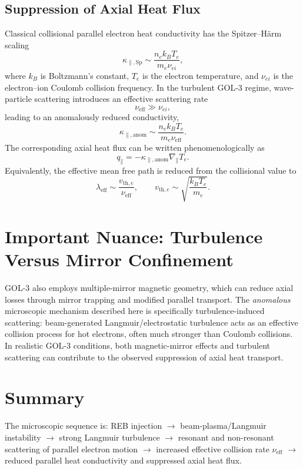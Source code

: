 \documentclass[11pt,a4paper]{article}
\begin{document}
\subsection{Suppression of Axial Heat Flux}
Classical collisional parallel electron heat conductivity has the Spitzer--H\"arm scaling
\begin{equation}
    \kappa_{\parallel,\mathrm{Sp}} \sim \frac{n_e k_B T_e}{m_e \nu_{ei}},
\end{equation}
where $k_B$ is Boltzmann's constant, $T_e$ is the electron temperature, and $\nu_{ei}$ is the electron--ion Coulomb collision frequency. In the turbulent GOL-3 regime, wave-particle scattering introduces an effective scattering rate
\begin{equation}
    \nu_{\mathrm{eff}} \gg \nu_{ei},
\end{equation}
leading to an anomalously reduced conductivity,
\begin{equation}
    \kappa_{\parallel,\mathrm{anom}} \sim \frac{n_e k_B T_e}{m_e \nu_{\mathrm{eff}}}.
\end{equation}
The corresponding axial heat flux can be written phenomenologically as
\begin{equation}
    q_\parallel = -\kappa_{\parallel,\mathrm{anom}} \nabla_\parallel T_e.
\end{equation}
Equivalently, the effective mean free path is reduced from the collisional value to
\begin{equation}
    \lambda_{\mathrm{eff}} \sim \frac{v_{\mathrm{th},e}}{\nu_{\mathrm{eff}}}, \qquad v_{\mathrm{th},e}\sim\sqrt{\frac{k_B T_e}{m_e}}.
\end{equation}

\section{Important Nuance: Turbulence Versus Mirror Confinement}

GOL-3 also employs multiple-mirror magnetic geometry, which can reduce axial losses through mirror trapping and modified parallel transport. The \emph{anomalous} microscopic mechanism described here is specifically turbulence-induced scattering: beam-generated Langmuir/electrostatic turbulence acts as an effective collision process for hot electrons, often much stronger than Coulomb collisions. In realistic GOL-3 conditions, both magnetic-mirror effects and turbulent scattering can contribute to the observed suppression of axial heat transport.

\section{Summary}

The microscopic sequence is: REB injection $\rightarrow$ beam-plasma/Langmuir instability $\rightarrow$ strong Langmuir turbulence $\rightarrow$ resonant and non-resonant scattering of parallel electron motion $\rightarrow$ increased effective collision rate $\nu_{\mathrm{eff}}$ $\rightarrow$ reduced parallel heat conductivity and suppressed axial heat flux.
\end{document}
